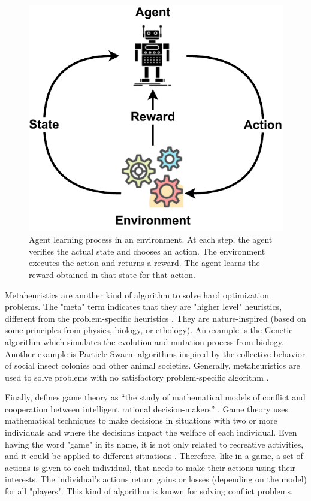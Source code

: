 \begin{figure}[!htb]
    \centering
    \includegraphics[scale=0.6]{Images/Related_works/Reinforcement_learning.pdf}
    \caption[Agent learning process in an environment]{Agent learning process in an environment. At each step, the agent verifies the actual state and chooses an action. The environment executes the action and returns a reward. The agent learns the reward obtained in that state for that action.}
    \label{fig:reinforcement}
\end{figure}

Metaheuristics are another kind of algorithm to solve hard optimization problems. The "meta" term indicates that they are "higher level" heuristics, different from the problem-specific heuristics \cite{boussaid2013survey}. They are nature-inspired (based on some principles from physics, biology, or ethology). An example is the Genetic algorithm which simulates the evolution and mutation process from biology. Another example is Particle Swarm algorithms inspired by the collective behavior of social insect colonies and other animal societies. Generally, metaheuristics are used to solve problems with no satisfactory problem-specific algorithm \cite{boussaid2013survey}.

Finally, \citeauthor{myerson1991game} defines game theory as ``the study of mathematical models of conflict and cooperation between intelligent rational decision-makers'' \cite{myerson1991game}. Game theory uses mathematical techniques to make decisions in situations with two or more individuals and where the decisions impact the welfare of each individual. Even having the word "game" in its name, it is not only related to recreative activities, and it could be applied to different situations \cite{myerson1991game, osborne2004introduction}. Therefore, like in a game, a set of actions is given to each individual, that needs to make their actions using their interests. The individual's actions return gains or losses (depending on the model) for all "players". This kind of algorithm is known for solving conflict problems.

